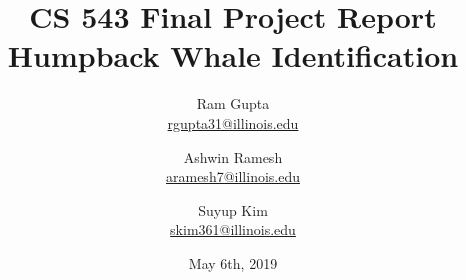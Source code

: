 \documentclass[12pt,letterpaper]{article}
\title{CS 543 Final Project Report\\
Humpback Whale Identification}
\author{
    Ram Gupta\\     
    \href{mailto:rgupta31@illinois.edu}{rgupta31@illinois.edu} 
    \and Ashwin Ramesh\\     
    \href{mailto:aramesh7@illinois.edu}{aramesh7@illinois.edu} 
    \and Suyup Kim\\
    \href{mailto:skim361@illinois.edu}{skim361@illinois.edu} 
   }
\date{May 6th, 2019}
\begin{document}
\maketitle



%
%

%

%



\pagebreak


\end{document}
